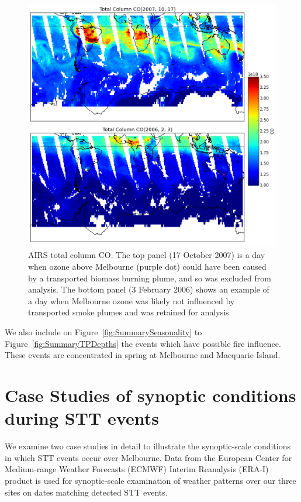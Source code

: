 \documentclass{article}
\begin{document}
    \begin{figure}[!htbp]
      \includegraphics[width=\textwidth]{figures/AIRS_compare.png}
      \caption{AIRS total column CO.
      The top panel (17 October 2007) is a day when ozone above Melbourne (purple dot) could have been caused by a transported biomass burning plume, and so was excluded from analysis.
      The bottom panel (3 February 2006) shows an example of a day when Melbourne ozone was likely not influenced by transported smoke plumes and was retained for analysis.}
      \label{fig:excludedeg}
    \end{figure}
    
    We also include on Figure~\ref{fig:SummarySeasonality} to Figure~\ref{fig:SummaryTPDepths} the events which have possible fire influence. 
    These events are concentrated in spring at Melbourne and Macquarie Island.

\section{Case Studies of synoptic conditions during STT events}

  We examine two case studies in detail to illustrate the synoptic-scale conditions in which STT events occur over Melbourne.
  Data from the European Center for Medium-range Weather Forecasts (ECMWF) Interim Reanalysis (ERA-I) \citep{Dee2011} product is used for synoptic-scale examination of weather patterns over our three sites on dates matching detected STT events.
  
\end{document}
